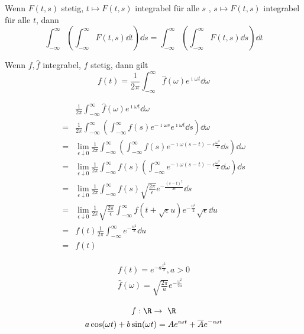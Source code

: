 \begin{satz*}[note = Satz von Fubini]
	Wenn $F(t,s)$ stetig, $t \mapsto F(t,s)$ integrabel für alle $s$ , $s \mapsto F(t,s)$ integrabel für alle $t$, dann
	\[ \int_{-\infty}^\infty \left( \int_{-\infty}^\infty F(t,s) \dd t \right) \dd s = \int_{-\infty}^\infty \left( \int_{-\infty}^\infty F(t,s) \dd s \right) \dd t \]
\end{satz*}
\begin{satz*}[note = Unkehrsatz von Fourier]
	Wenn $f,\hat{f}$ integrabel, $f$ stetig, dann gilt
	\[ f(t) = \frac{1}{2\pi} \int_{-\infty}^\infty \hat{f}(\omega) e^{\imath\omega t} \dd \omega \]
	\begin{bew}
		\[ \begin{split}
				&\frac{1}{2\pi} \int_{-\infty}^\infty \hat{f}(\omega) e^{\imath\omega t} \dd \omega \\
			=	&\frac{1}{2\pi} \int_{-\infty}^\infty \left( \int_{-\infty}^\infty f(s) e^{-\imath\omega s} e^{\imath\omega t} \dd s \right) \dd \omega \\
			=	&\lim_{\epsilon \downarrow 0} \frac{1}{2\pi} \int_{-\infty}^\infty \left( \int_{-\infty}^\infty f(s) e^{-\imath\omega (s-t) - \epsilon \frac{\omega^2}{2}} \dd s \right) \dd \omega \\
			=	&\lim_{\epsilon \downarrow 0} \frac{1}{2\pi} \int_{-\infty}^\infty f(s) \left( \int_{-\infty}^\infty e^{-\imath\omega (s-t) - \epsilon \frac{\omega^2}{2}} \dd \omega \right) \dd s \\
			=	&\lim_{\epsilon \downarrow 0} \frac{1}{2\pi} \int_{-\infty}^\infty f(s) \sqrt{\frac{2\pi}{\epsilon}} e^{-\frac{(s-t)^2}{2\epsilon}} \dd s \\
			=	&\lim_{\epsilon \downarrow 0} \frac{1}{2\pi} \sqrt{\frac{2\pi}{\epsilon}} \int_{-\infty}^\infty f(t + \sqrt{\epsilon} u ) e^{-\frac{u^2}{2}} \sqrt{\epsilon} \dd u \\
			=	&f(t) \frac{1}{2\pi} \int_{-\infty}^\infty e^{-\frac{u^2}{2}} \dd u \\
			=	&f(t)
		\end{split} \]
	\end{bew}
\end{satz*}
\begin{bsp*}
	\begin{gather*}
		f(t) = e^{-a \frac{t^2}{2}} , a > 0 \\
		\hat{f}(\omega) = \sqrt{\frac{2\pi}{a}} e^{-\frac{\omega^2}{2a}}
	\end{gather*}
\end{bsp*}
\begin{gather*}
	f : \R \rightarrow \R \\
	a \cos(\omega t) + b \sin(\omega t) = Ae^{\imath\omega t} + \overline{A}e^{-\imath\omega t}
\end{gather*}
